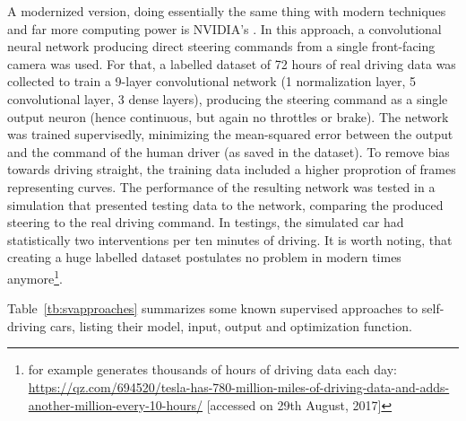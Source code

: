 A modernized version, doing essentially the same thing with modern techniques and far more computing power is NVIDIA's \cite{bojarski_end_2016}. In this approach, a convolutional neural network producing direct steering commands from a single front-facing camera was used. For that, a labelled dataset of 72 hours of real driving data was collected to train a 9-layer convolutional network (1 normalization layer, 5 convolutional layer, 3 dense layers), producing the steering command as a single output neuron (hence continuous, but again no throttles or brake). The network was trained supervisedly, minimizing the mean-squared error between the output and the command of the human driver (as saved in the dataset). To remove bias towards driving straight, the training data included a higher proprotion of frames representing curves. 
The performance of the resulting network was tested in a simulation that presented testing data to the network, comparing the produced steering to the real driving command. In testings, the simulated car had statistically two interventions per ten minutes of driving. It is worth noting, that creating a huge labelled dataset postulates no problem in modern times anymore\footnote{ for example generates thousands of hours of driving data each day: \url{https://qz.com/694520/tesla-has-780-million-miles-of-driving-data-and-adds-another-million-every-10-hours/} [accessed on 29th August, 2017]}.

Table~\ref{tb:svapproaches} summarizes some known supervised approaches to self-driving cars, listing their model, input, output and optimization function.


